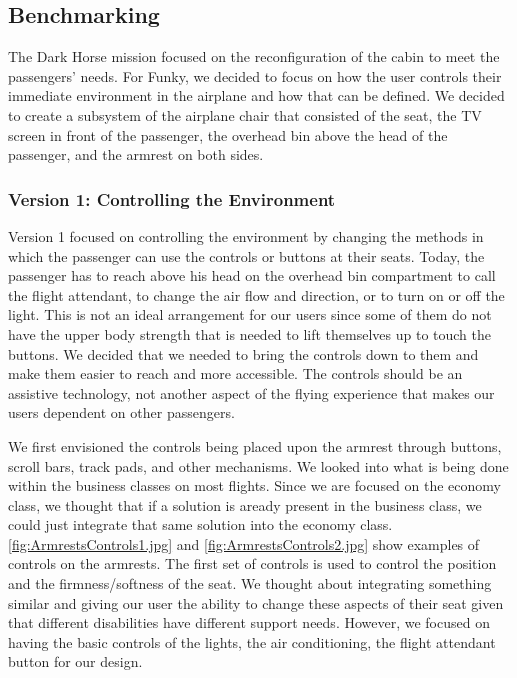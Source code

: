 \subsection{Benchmarking}

The Dark Horse mission focused on the reconfiguration of the cabin to meet the passengers' needs.  For Funky, we decided to focus on how the user controls their immediate environment in the airplane and how that can be defined.  We decided to create a subsystem of the airplane chair that consisted of the seat, the TV screen in front of the passenger, the overhead bin above the head of the passenger, and the armrest on both sides.

\subsubsection*{Version 1: Controlling the Environment} 
Version 1 focused on controlling the environment by changing the methods in which the passenger can use the controls or buttons at their seats.  Today, the passenger has to reach above his head on the overhead bin compartment to call the flight attendant, to change the air flow and direction, or to turn on or off the light.  This is not an ideal arrangement for our users since some of them do not have the upper body strength that is needed to lift themselves up to touch the buttons.  We decided that we needed to bring the controls down to them and make them easier to reach and more accessible.  The controls should be an assistive technology, not another aspect of the flying experience that makes our users dependent on other passengers.   

We first envisioned the controls being placed upon the armrest through buttons, scroll bars, track pads, and other mechanisms. We looked into what is being done within the business classes on most flights.  Since we are focused on the economy class, we thought that if a solution is aready present in the business class, we could just integrate that same solution into the economy class. \ref{fig:ArmrestsControls1.jpg} and \ref{fig:ArmrestsControls2.jpg} show examples of controls on the armrests.  The first set of controls is used to control the position and the firmness/softness of the seat.  We thought about integrating  something similar and giving our user the ability to change these aspects of their seat given that different disabilities have different support needs. However, we focused on having the basic controls of the lights, the air conditioning, the flight attendant button for our design. 

